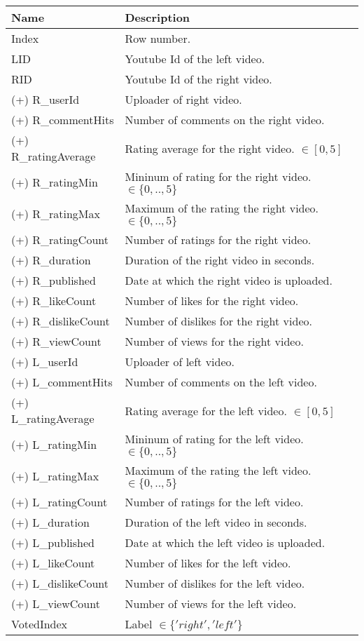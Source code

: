 \begin{table}[p]
	\begin{center}
	\begin{tabular}{||l|l||}
		\hline
		
		{\bf  Name} & {\bf Description}\\ \hline
		Index & Row number.\\ \hline
		LID & Youtube Id of the left video.\\ \hline
		RID & Youtube Id of the right video.\\ \hline
		(+) R\_userId & Uploader of right video.\\ \hline
		(+) R\_commentHits & Number of comments on the right video. \\ \hline
		(+) R\_ratingAverage & Rating average for the right video. $\in [0,5]$\\
		\hline (+) R\_ratingMin & Mininum of rating for the right video. $\in
		\{0,..,5\}$\\
		\hline (+) R\_ratingMax & Maximum of the rating the right video. $\in
		\{0,..,5\}$ \\ \hline
		(+) R\_ratingCount & Number of ratings for the right video.\\ \hline
		(+) R\_duration & Duration of the right video in seconds.\\ \hline
		(+) R\_published & Date at which the right video is uploaded.\\ \hline
		(+) R\_likeCount & Number of likes for the right video.\\ \hline
		(+) R\_dislikeCount & Number of dislikes for the right video.\\ \hline
		(+) R\_viewCount & Number of views for the right video.\\ \hline
		(+) L\_userId & Uploader of left video.\\ \hline
		(+) L\_commentHits & Number of comments on the left video.\\ \hline
		(+) L\_ratingAverage & Rating average for the left video. $\in [0,5]$\\ \hline
		(+) L\_ratingMin & Mininum of rating for the left video. $\in
		\{0,..,5\}$\\ \hline
		(+) L\_ratingMax & Maximum of the rating the left video. $\in
		\{0,..,5\}$\\ \hline
		(+) L\_ratingCount & Number of ratings for the left video.\\ \hline
		(+) L\_duration & Duration of the left video in seconds.\\ \hline
		(+) L\_published & Date at which the left video is uploaded.\\ \hline
		(+) L\_likeCount & Number of likes for the left video.\\ \hline
		(+) L\_dislikeCount & Number of dislikes for the left video.\\ \hline
		(+) L\_viewCount & Number of views for the left video.\\ \hline
		VotedIndex & Label $\in \{'right', 'left'\}$\\ \hline


\end{tabular}
\end{center}
\end{table}
